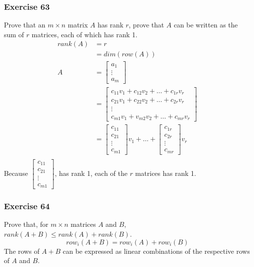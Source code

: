 \documentclass[letterpaper, 12pt]{math}
\begin{document}
\subsubsection*{Exercise 63}
Prove that an \( m\times n \) matrix \( A \) has rank \( r \), prove that
\( A \) can be written as the sum of \( r \) matrices, each of which has rank 1.
\begin{align*}
  rank(A) &= r \\
  &= dim(row(A)) \\
  A &= \begin{bmatrix}a_1 \\ \vdots \\ a_m\end{bmatrix} \\
  &= \begin{bmatrix}
    c_{11}v_1+c_{12}v_2+\dots+c_{1r}v_r \\
    c_{21}v_1+c_{22}v_2+\dots+c_{2r}v_r \\
    \vdots \\
    c_{m1}v_1+v_{m2}v_2+\dots+c_{mr}v_r
  \end{bmatrix} \\
  &= \begin{bmatrix}c_{11} \\ c_{21} \\ \vdots \\ c_{m1}\end{bmatrix}v_1+\dots+
    \begin{bmatrix}c_{1r} \\ c_{2r} \\ \vdots \\ c_{mr}\end{bmatrix}v_r \\
\end{align*}
Because \( \begin{bmatrix}c_{11} \\ c_{21} \\ \vdots \\ c_{m1}\end{bmatrix} \),
has rank 1, each of the \( r \) matrices has rank 1.

\subsubsection*{Exercise 64}
Prove that, for \( m\times n \) matrices \( A \) and \( B \), \( rank(A+B)\le
rank(A)+rank(B) \).
\[ row_i(A+B) = row_i(A)+row_i(B) \]
The rows of \( A+B \) can be expressed as linear combinations of the respective
rows of \( A \) and \( B \).
\end{document}
